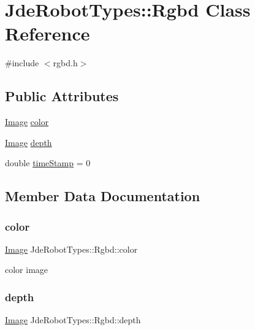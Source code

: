 \hypertarget{class_jde_robot_types_1_1_rgbd}{}\section{Jde\+Robot\+Types\+:\+:Rgbd Class Reference}
\label{class_jde_robot_types_1_1_rgbd}


{\ttfamily \#include $<$rgbd.\+h$>$}

\subsection*{Public Attributes}
\begin{DoxyCompactItemize}
\item 
\hyperlink{class_jde_robot_types_1_1_image}{Image} \hyperlink{class_jde_robot_types_1_1_rgbd_ab90a8a0c675991336bca7deabe85d36f}{color}
\item 
\hyperlink{class_jde_robot_types_1_1_image}{Image} \hyperlink{class_jde_robot_types_1_1_rgbd_adf553911edf4bcd1dadea9409261ba49}{depth}
\item 
double \hyperlink{class_jde_robot_types_1_1_rgbd_a6cf1e3e9b469df3c599b711a2edcf6ba}{time\+Stamp} = 0
\end{DoxyCompactItemize}


\subsection{Member Data Documentation}
\mbox{\label{class_jde_robot_types_1_1_rgbd_ab90a8a0c675991336bca7deabe85d36f}} 
\subsubsection{\texorpdfstring{color}{color}}
{\footnotesize\ttfamily \hyperlink{class_jde_robot_types_1_1_image}{Image} Jde\+Robot\+Types\+::\+Rgbd\+::color}

color image \mbox{\label{class_jde_robot_types_1_1_rgbd_adf553911edf4bcd1dadea9409261ba49}} 
\subsubsection{\texorpdfstring{depth}{depth}}
{\footnotesize\ttfamily \hyperlink{class_jde_robot_types_1_1_image}{Image} Jde\+Robot\+Types\+::\+Rgbd\+::depth}

